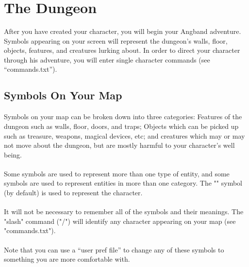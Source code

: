 \section{The Dungeon}
\paragraph{}After you have created your character, you will begin your
Angband adventure.  Symbols appearing on your screen will represent the
dungeon's walls, floor, objects, features, and creatures lurking about.
In order to direct your character through his adventure, you will enter
single character commands (see ``commands.txt'').

\subsection{Symbols On Your Map}
\paragraph{}Symbols on your map can be broken down into three categories: Features of
the dungeon such as walls, floor, doors, and traps; Objects which can be
picked up such as treasure, weapons, magical devices, etc; and creatures
which may or may not move about the dungeon, but are mostly harmful to your
character's well being.

\paragraph{}Some symbols are used to represent more than one type of entity, and some
symbols are used to represent entities in more than one category. The "\@"
symbol (by default) is used to represent the character.

\paragraph{}It will not be necessary to remember all of the symbols and their meanings.
The "slash" command ("/") will identify any character appearing on your map
(see "commands.txt").

\paragraph{}Note that you can use a ``user pref file'' to change any of these symbols to
something you are more comfortable with.
   
